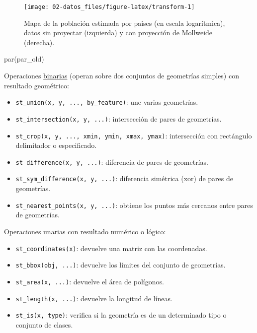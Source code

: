 \documentclass[
  spanish,
]{book}
\newenvironment{Shaded}{\begin{snugshade}}{\end{snugshade}}
\newcommand{\FunctionTok}[1]{\textcolor[rgb]{0.00,0.00,0.00}{#1}}
\newcommand{\NormalTok}[1]{#1}
\providecommand{\tightlist}{%
  \setlength{\itemsep}{0pt}\setlength{\parskip}{0pt}}
\theoremstyle{break}
\begin{document}
\begin{figure}[!htb]

{\centering \texttt{[image: 02-datos\_files/figure-latex/transform-1]} 

}

\caption{Mapa de la población estimada por paises (en escala logarítmica), datos sin proyectar (izquierda) y con proyección de Mollweide (derecha).}\label{fig:transform}
\end{figure}

\begin{Shaded}
\begin{Highlighting}[]
\FunctionTok{par}\NormalTok{(par\_old)}
\end{Highlighting}
\end{Shaded}

Operaciones \href{https://r-spatial.github.io/sf/reference/geos_binary_ops.html}{binarias} (operan sobre dos conjuntos de geometrías simples) con resultado geométrico:

\begin{itemize}
\tightlist
\item
  \texttt{st\_union(x,\ y,\ ...,\ by\_feature)}: une varias geometrías.
\item
  \texttt{st\_intersection(x,\ y,\ ...)}: intersección de pares de geometrías.
\item
  \texttt{st\_crop(x,\ y,\ ...,\ xmin,\ ymin,\ xmax,\ ymax)}: intersección con rectángulo delimitador o especificado.
\item
  \texttt{st\_difference(x,\ y,\ ...)}: diferencia de pares de geometrías.
\item
  \texttt{st\_sym\_difference(x,\ y,\ ...)}: diferencia simétrica (xor) de pares de geometrías.
\item
  \texttt{st\_nearest\_points(x,\ y,\ ...)}: obtiene los puntos más cercanos entre pares de geometrías.
\end{itemize}

Operaciones unarias con resultado numérico o lógico:

\begin{itemize}
\tightlist
\item
  \texttt{st\_coordinates(x)}: devuelve una matriz con las coordenadas.
\item
  \texttt{st\_bbox(obj,\ ...)}: devuelve los límites del conjunto de geometrías.
\item
  \texttt{st\_area(x,\ ...)}: devuelve el área de polígonos.
\item
  \texttt{st\_length(x,\ ...)}: devuelve la longitud de líneas.
\item
  \texttt{st\_is(x,\ type)}: verifica si la geometría es de un determinado tipo o conjunto de clases.
\end{itemize}
\end{document}
